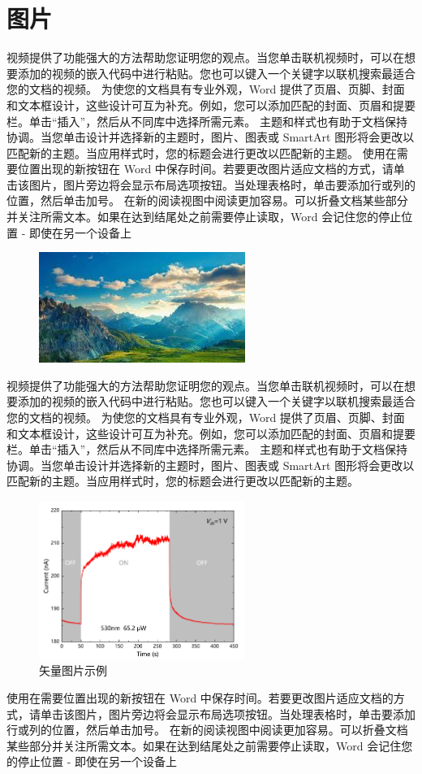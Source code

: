 \section{图片}
视频提供了功能强大的方法帮助您证明您的观点。当您单击联机视频时，可以在想要添加的视频的嵌入代码中进行粘贴。您也可以键入一个关键字以联机搜索最适合您的文档的视频。
为使您的文档具有专业外观，Word 提供了页眉、页脚、封面和文本框设计，这些设计可互为补充。例如，您可以添加匹配的封面、页眉和提要栏。单击“插入”，然后从不同库中选择所需元素。
主题和样式也有助于文档保持协调。当您单击设计并选择新的主题时，图片、图表或 SmartArt 图形将会更改以匹配新的主题。当应用样式时，您的标题会进行更改以匹配新的主题。
使用在需要位置出现的新按钮在 Word 中保存时间。若要更改图片适应文档的方式，请单击该图片，图片旁边将会显示布局选项按钮。当处理表格时，单击要添加行或列的位置，然后单击加号。
在新的阅读视图中阅读更加容易。可以折叠文档某些部分并关注所需文本。如果在达到结尾处之前需要停止读取，Word 会记住您的停止位置 - 即使在另一个设备上
\begin{figure}[H]
	\centering
	\includegraphics[width=0.6\textwidth]{figure/chapter1/Omni.jpg}
	\label{picexam}
\end{figure}
视频提供了功能强大的方法帮助您证明您的观点。当您单击联机视频时，可以在想要添加的视频的嵌入代码中进行粘贴。您也可以键入一个关键字以联机搜索最适合您的文档的视频。
为使您的文档具有专业外观，Word 提供了页眉、页脚、封面和文本框设计，这些设计可互为补充。例如，您可以添加匹配的封面、页眉和提要栏。单击“插入”，然后从不同库中选择所需元素。
主题和样式也有助于文档保持协调。当您单击设计并选择新的主题时，图片、图表或 SmartArt 图形将会更改以匹配新的主题。当应用样式时，您的标题会进行更改以匹配新的主题。
\begin{figure}[H]
	\centering
	\includegraphics[width=0.6\textwidth]{figure/chapter1/Graph3.pdf}
	\caption{矢量图片示例 }	
	\label{pdfpic}
\end{figure}
使用在需要位置出现的新按钮在 Word 中保存时间。若要更改图片适应文档的方式，请单击该图片，图片旁边将会显示布局选项按钮。当处理表格时，单击要添加行或列的位置，然后单击加号。
在新的阅读视图中阅读更加容易。可以折叠文档某些部分并关注所需文本。如果在达到结尾处之前需要停止读取，Word 会记住您的停止位置 - 即使在另一个设备上


